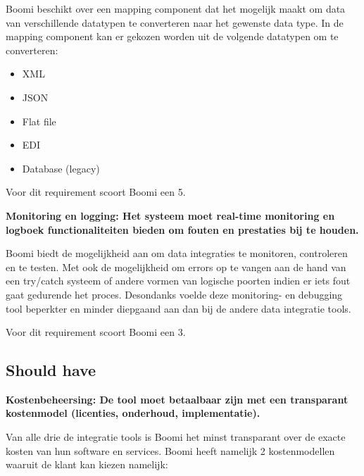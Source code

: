 \vspace{\baselineskip}

Boomi beschikt over een mapping component dat het mogelijk maakt om data van verschillende datatypen te converteren naar het gewenste data type. In de mapping component kan er gekozen worden uit de volgende datatypen om te converteren:

\begin{itemize}
    \item XML
    \item JSON
    \item Flat file
    \item EDI
    \item Database (legacy)
\end{itemize}

Voor dit requirement scoort Boomi een 5.


\vspace{\baselineskip}


\textbf{Monitoring en logging: Het systeem moet real-time monitoring en logboek functionaliteiten bieden om fouten en prestaties bij te houden.}

\vspace{\baselineskip}

Boomi biedt de mogelijkheid aan om data integraties te monitoren, controleren en te testen. Met ook de mogelijkheid om errors op te vangen aan de hand van een try/catch systeem of andere vormen van logische poorten indien er iets fout gaat gedurende het proces. Desondanks voelde deze monitoring- en debugging tool beperkter en minder diepgaand aan dan bij de andere data integratie tools.

Voor dit requirement scoort Boomi een 3.


\vspace{\baselineskip}

\subsection{Should have}%
\label{ShouldHaveBoomi}

\textbf{Kostenbeheersing: De tool moet betaalbaar zijn met een transparant kostenmodel (licenties, onderhoud, implementatie).}

\vspace{\baselineskip}

Van alle drie de integratie tools is Boomi het minst transparant over de exacte kosten van hun software en services. Boomi heeft namelijk 2 kostenmodellen waaruit de klant kan kiezen namelijk:

